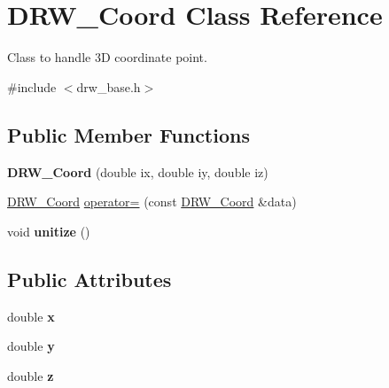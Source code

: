 \hypertarget{classDRW__Coord}{\section{D\-R\-W\-\_\-\-Coord Class Reference}
\label{classDRW__Coord}
}


Class to handle 3\-D coordinate point.  




{\ttfamily \#include $<$drw\-\_\-base.\-h$>$}

\subsection*{Public Member Functions}
\begin{DoxyCompactItemize}
\item 
\hypertarget{classDRW__Coord_acc52f5f7771d3258549528ffd650722b}{{\bfseries D\-R\-W\-\_\-\-Coord} (double ix, double iy, double iz)}\label{classDRW__Coord_acc52f5f7771d3258549528ffd650722b}

\item 
\hyperlink{classDRW__Coord}{D\-R\-W\-\_\-\-Coord} \hyperlink{classDRW__Coord_a437b497bab4345ae2df8dc5d89bf865a}{operator=} (const \hyperlink{classDRW__Coord}{D\-R\-W\-\_\-\-Coord} \&data)
\item 
\hypertarget{classDRW__Coord_a3be925a97206729efb4c58aae00f4ecc}{void {\bfseries unitize} ()}\label{classDRW__Coord_a3be925a97206729efb4c58aae00f4ecc}

\end{DoxyCompactItemize}
\subsection*{Public Attributes}
\begin{DoxyCompactItemize}
\item 
\hypertarget{classDRW__Coord_a59a18ce0932d7600ad028a72a925258d}{double {\bfseries x}}\label{classDRW__Coord_a59a18ce0932d7600ad028a72a925258d}

\item 
\hypertarget{classDRW__Coord_a8f230233b04fd79d73687fdfad1edf4d}{double {\bfseries y}}\label{classDRW__Coord_a8f230233b04fd79d73687fdfad1edf4d}

\item 
\hypertarget{classDRW__Coord_a62911e564ad8bb21dd364ffa3053b9b2}{double {\bfseries z}}\label{classDRW__Coord_a62911e564ad8bb21dd364ffa3053b9b2}

\end{DoxyCompactItemize}


